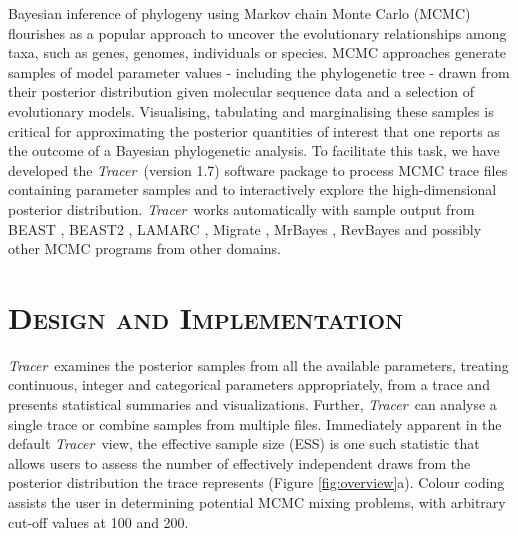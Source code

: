 \documentclass[webpdf,mynatbib,nosurname,nogrid,noCE,noMSC]{SYS}
\newcommand{\tracer}{\emph{Tracer}}
\begin{document}
\indent Bayesian inference of phylogeny using Markov chain Monte Carlo (MCMC) \citep{rannala1996probability, mau1999bayesian, drummond2002estimating} flourishes as a popular approach to uncover the evolutionary relationships among taxa, such as genes, genomes, individuals or species.
MCMC approaches generate samples of model parameter values - including the phylogenetic tree - drawn from their posterior distribution given molecular sequence data and a selection of evolutionary models.
Visualising, tabulating and marginalising these samples is critical for approximating the posterior quantities of interest that one reports as the outcome of a Bayesian phylogenetic analysis.
To facilitate this task, we have developed the \tracer\ (version 1.7) software package to
process MCMC trace files containing parameter samples and to interactively explore the high-dimensional posterior distribution.
\tracer\ works automatically with sample output from BEAST \citep{drummond2012bayesian}, BEAST2 \citep{bouckaert2014beast2},  LAMARC \citep{kuhner2006lamarc},  Migrate \citep{beerli2006comparison}, MrBayes \citep{ronquist2012mrbayes}, RevBayes \citep{hohna2016revbayes} and possibly other MCMC programs from other domains.

\vspace{-2em}
\section*{\textsc{Design and Implementation}}

\tracer\ examines the posterior samples from all the available parameters, treating continuous, integer and categorical parameters appropriately,
from a trace
and presents statistical summaries and visualizations.
Further, \tracer\ can analyse a single trace or combine samples from multiple files.
Immediately apparent in the default \tracer\ view, the effective sample size (ESS) is one such statistic that
allows users to assess the number of effectively independent draws from the posterior distribution the trace represents (Figure \ref{fig:overview}a).
Colour coding assists the user in determining potential MCMC mixing problems, with arbitrary cut-off values at 100 and 200.
\end{document}
